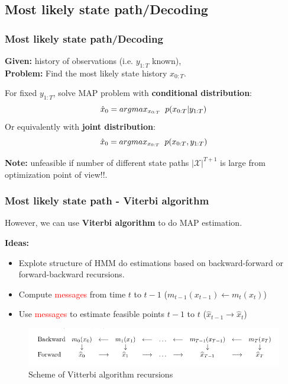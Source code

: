 \documentclass[xcolor=dvipsnames, compress]{beamer}
\begin{document}
\begin{frame}
\section{Most likely state path/Decoding}
\frametitle{Most likely state path/Decoding}

\textbf{Given:} history of observations (i.e. $y_{1:T}$ known),\\
\textbf{Problem:} Find the most likely state history $x_{0:T}$.

\vspace{0.5cm}

For fixed $y_{1:T}$, solve MAP problem with \textbf{conditional distribution}:
\begin{equation*}
\hat{x}_0 = argmax_{x_{0:T}} \hspace{0.2cm} p(x_{0:T}| y_{1:T}) 
\end{equation*}
Or equivalently with \textbf{joint distribution}:
\begin{equation*}
\hat{x}_0 = argmax_{x_{0:T}} \hspace{0.2cm} p(x_{0:T}, y_{1:T})
\end{equation*}

\textbf{Note:} unfeasible if number of different state paths $|\mathcal{X}|^{T+1}$ is large from optimization point of view!!.

\end{frame}

\begin{frame}
\frametitle{Most likely state path - Viterbi algorithm}

However, we can use \textbf{Viterbi algorithm} to do MAP estimation.

\textbf{Ideas:}

\begin{itemize}
	\item Explote structure of HMM do estimations based on backward-forward or forward-backward recursions.
	\item Compute \textcolor{red}{messages} from time $t$  to $t-1$ ($m_{t-1}(x_{t-1}) \leftarrow m_{t}(x_{t})$)
	\item Use \textcolor{red}{messages} to estimate feasible points $t-1$  to $t$ ($\hat{x}_{t-1} \rightarrow \hat{x}_{t}$)	
\end{itemize}

\begin{figure}
	\includegraphics[scale=0.4]{images/viterbi1.jpg}
	\caption{Scheme of Vitterbi algorithm recursions}
\end{figure}

\end{frame}
\end{document}
